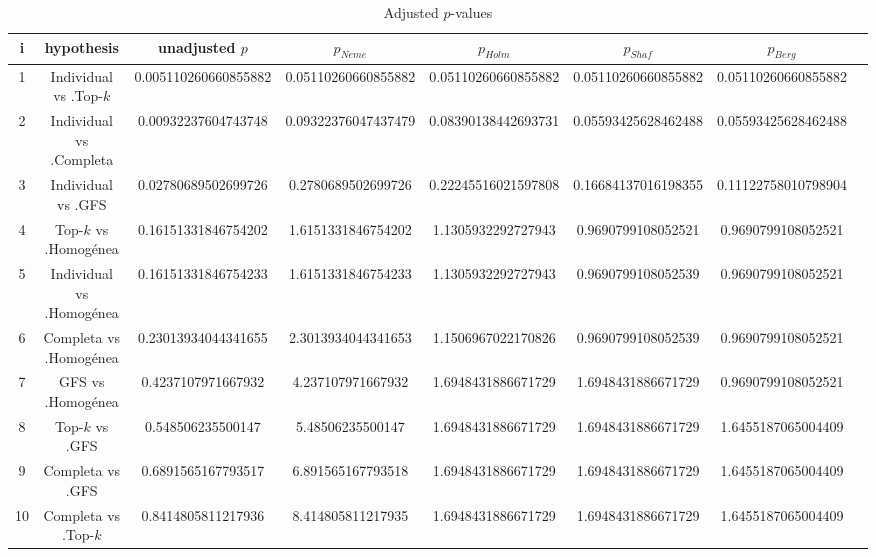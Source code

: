 \documentclass[a4paper,10pt]{article}
\begin{document}
\begin{landscape}
\begin{table}[!htp]
\centering\tiny
\caption{Adjusted $p$-values}
\begin{tabular}{cccccccc}
i&hypothesis&unadjusted $p$&$p_{Neme}$&$p_{Holm}$&$p_{Shaf}$&$p_{Berg}$\\
\hline
1&Individual vs .Top-$k$&0.005110260660855882&0.05110260660855882&0.05110260660855882&0.05110260660855882&0.05110260660855882\\
2&Individual vs .Completa&0.00932237604743748&0.09322376047437479&0.08390138442693731&0.05593425628462488&0.05593425628462488\\
3&Individual vs .GFS&0.02780689502699726&0.2780689502699726&0.22245516021597808&0.16684137016198355&0.11122758010798904\\
4&Top-$k$ vs .Homogénea&0.16151331846754202&1.6151331846754202&1.1305932292727943&0.9690799108052521&0.9690799108052521\\
5&Individual vs .Homogénea&0.16151331846754233&1.6151331846754233&1.1305932292727943&0.9690799108052539&0.9690799108052521\\
6&Completa vs .Homogénea&0.23013934044341655&2.3013934044341653&1.1506967022170826&0.9690799108052539&0.9690799108052521\\
7&GFS vs .Homogénea&0.4237107971667932&4.237107971667932&1.6948431886671729&1.6948431886671729&0.9690799108052521\\
8&Top-$k$ vs .GFS&0.548506235500147&5.48506235500147&1.6948431886671729&1.6948431886671729&1.6455187065004409\\
9&Completa vs .GFS&0.6891565167793517&6.891565167793518&1.6948431886671729&1.6948431886671729&1.6455187065004409\\
10&Completa vs .Top-$k$&0.8414805811217936&8.414805811217935&1.6948431886671729&1.6948431886671729&1.6455187065004409\\
\hline
\end{tabular}
\end{table}

\end{landscape}
\end{document}
